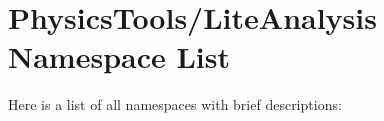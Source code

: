 \section{Physics\-Tools/Lite\-Analysis Namespace List}
Here is a list of all namespaces with brief descriptions:\begin{CompactList}
\item{}
\end{CompactList}
